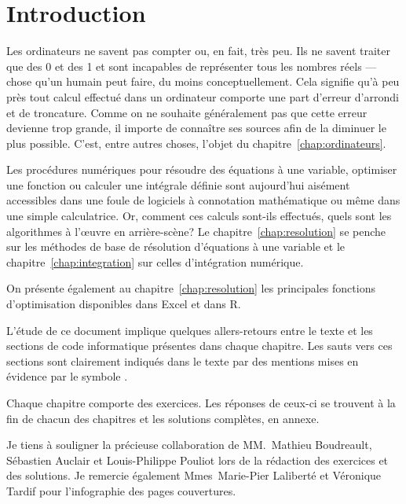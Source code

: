 \chapter*{Introduction}

Les ordinateurs ne savent pas compter ou, en fait, très peu. Ils ne
savent traiter que des 0 et des 1 et sont incapables de représenter
tous les nombres réels --- chose qu'un humain peut faire, du moins
conceptuellement. Cela signifie qu'à peu près tout calcul effectué
dans un ordinateur comporte une part d'erreur d'arrondi et de
troncature. Comme on ne souhaite généralement pas que cette erreur
devienne trop grande, il importe de connaître ses sources afin de la
diminuer le plus possible. C'est, entre autres choses, l'objet du
chapitre~\ref{chap:ordinateurs}.

Les procédures numériques pour résoudre des équations à une variable,
optimiser une fonction ou calculer une intégrale définie sont
aujourd'hui aisément accessibles dans une foule de logiciels à
connotation mathématique ou même dans une simple calculatrice. Or,
comment ces calculs sont-ils effectués, quels sont les algorithmes à
l'{\oe}uvre en arrière-scène? Le chapitre~\ref{chap:resolution} se
penche sur les méthodes de base de résolution d'équations à une
variable et le chapitre~\ref{chap:integration} sur celles
d'intégration numérique.

On présente également au chapitre~\ref{chap:resolution} les
principales fonctions d'optimisation disponibles dans Excel et dans R.

L'étude de ce document implique quelques allers-retours entre le texte
et les sections de code informatique présentes dans chaque chapitre.
Les sauts vers ces sections sont clairement indiqués dans le texte par
des mentions mises en évidence par le symbole {\ForwardToEnd}.

Chaque chapitre comporte des exercices. Les réponses de ceux-ci se
trouvent à la fin de chacun des chapitres et les solutions complètes,
en annexe.

Je tiens à souligner la précieuse collaboration de MM.~Mathieu
Boudreault, Sébastien Auclair et Louis-Philippe Pouliot lors de la
rédaction des exercices et des solutions. Je remercie également
Mmes~Marie-Pier Laliberté et Véronique Tardif pour l'infographie des
pages couvertures.

